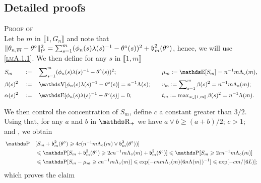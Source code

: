 \subsection{Detailed proofs}
\begin{pro}{\textsc{Proof of } \\}\label{proB.2.1}
Let be $m$ in $\llbracket 1, G_{n} \rrbracket$ and note that
$\Vert \theta_{n, \overline{m}} - \theta^{\circ} \Vert_{l^{2}}^{2} = \sum\nolimits_{s = 1}^{m} (\phi_{n}(s)\lambda(s)^{-1} - \theta^{\circ}(s))^{2} + \operatorname{\mathfrak{b}}_{m}^{2}(\theta^{\circ})$, 
hence, we will use \textsc{\cref{lmA.1.1}}.
We then define for any $s$ in $\llbracket 1, m \rrbracket$
\begin{alignat*}{4}
& S_{m} && := && \sum\nolimits_{s = 1}^{m} (\phi_{n}(s)\lambda(s)^{-1} - \theta^{\circ}(s))^{2}; \quad && \mu_{m} := \E[S_{m}] = n^{-1} m \Lambda_{\circ}(m),\\
& \beta(s)^{2} && := && \V[\phi_{n}(s)\lambda(s)^{-1} - \theta^{\circ}(s)] = n^{-1}\Lambda(s); \quad && v_{m} := \sum\nolimits_{s = 1}^{m}\beta(s)^{2} = n^{-1} m \Lambda_{\circ}(m);\\
& \alpha(s)^{2} && := && \E[\phi_{n}(s)\lambda(s)^{-1} - \theta^{\circ}(s)] = 0; \quad && t_{m} := \max\nolimits_{s \in \llbracket 1, m \rrbracket}\beta(s)^{2} = n^{-1}\Lambda(m).
\end{alignat*}

We then control the concentration of $S_{m}$, define $c$ a constant greater than $3/2$.
Using that, for any $a$ and $b$ in $\R_{+}$ we have $a \vee b \geq (a + b)/2$; $c > 1$; and , we obtain
\begin{alignat*}{2}
& \P&&[S_{m} + \b_{m}^{2}(\theta^{\circ}) \geq 4 c (n^{-1} m \Lambda_{\circ}(m) \vee \b_{m}^{2}(\theta^{\circ})) ]\\
& && \leq \P[S_{m} + \b_{m}^{2}(\theta^{\circ}) \geq 2 c n^{-1} m \Lambda_{\circ}(m) + \b_{m}^{2}(\theta^{\circ}) ] \leq \P[S_{m} \geq 2 c n^{-1} m \Lambda_{\circ}(m) ]\\
& && \leq \P[S_{m} - \mu_{m} \geq c n^{-1} m \Lambda_{\circ}(m) ] \leq \exp[- c n m \Lambda_{\circ}(m) (6 n \Lambda(m))^{-1}] \leq \exp[- c m / (6 L)];
\end{alignat*}
which proves the claim
\proEnd
\end{pro}

